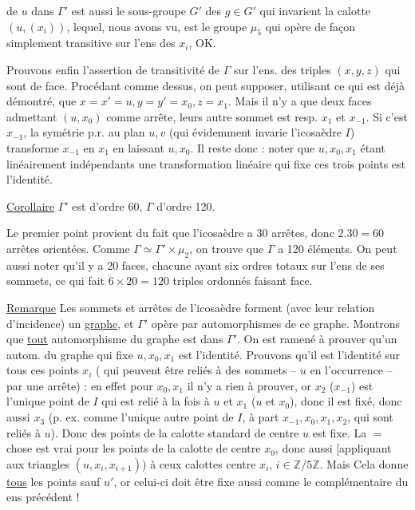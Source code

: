 de $u$ dans  $\Gamma'$ est aussi le sous-groupe  $G'$  des $g\in G'$ qui invarient la calotte $(u,(x_i))$, lequel, nous avons vu, est le groupe $\mu_5$ qui opère de façon simplement transitive sur l'ens des $x_i$, OK.

Prouvons enfin l'assertion de  transitivité de $\Gamma$ sur l'ens. des  triples $(x,y,z)$ qui sont de face. Procédant comme dessus, on peut supposer, utilisant ce qui est déjà démontré, que $x=x'=u,y=y'=x_0,z=x_1$. Mais il n'y a que deux  faces  admettant $(u,x_0)$ comme arrête, leurs autre sommet est resp. $x_1$ et $x_{-1}$. Si c'est $x_{-1}$, la symétrie p.r. au plan $u,v$ (qui évidemment invarie l'icosaèdre $I$) transforme $x_{-1}$ en $x_1$ en laissant $u,x_0$. Il reste donc :  noter que $u,x_0,x_1$  étant linéairement indépendants une transformation linéaire qui fixe ces trois points est l'identité.

\uline{Corollaire} $\Gamma'$ est d'ordre 60, $\Gamma$ d'ordre 120.

Le premier point provient du fait que l'icosaèdre a 30 arrêtes, donc $2.30=60$ arrêtes orientées. Comme $\Gamma\simeq\Gamma'\times\mu_2$, on trouve que $\Gamma$ a 120 éléments. On peut aussi noter qu'il y a 20 faces, chacune ayant  six ordres totaux sur l'ens de ses sommets, ce qui fait $6\times20=120$ triples ordonnés faisant face.

\uline{Remarque} Les sommets et arrêtes de l'icosaèdre forment (avec leur relation d'incidence) un \uline{graphe}, et $\Gamma'$ opère par automorphismes de ce graphe. Montrons que \uline{tout} automorphisme  du graphe est dans $\Gamma'$. On est ramené à  prouver  qu'un autom. du graphe qui fixe $u,x_0,x_1$  est l'identité. Prouvons qu'il est l'identité sur tous ces points $x_i$ ( qui peuvent être reliés à  des sommets -- $u$ en l'occurrence -- par une arrête) : en effet  pour $x_0,x_1$ il n'y a rien à prouver, or $x_2$ ($x_{-1}$) est l'unique point de $I$  qui est relié  à la fois à $u$ et $x_1$ ($u$ et $x_0$), donc il est fixé, donc aussi $x_3$ (p. ex. comme
l'unique autre point de $I$, à part $x_{-1},x_0,x_1,x_2$, qui sont reliés à $u$). Donc   des points  de la calotte standard  de centre $u$ est fixe. La $=$ chose est vrai pour les points de la calotte de centre $x_0$, donc aussi [appliquant  aux triangles $(u,x_i,x_{i+1})$) à ceux  calottes  centre $x_i$, $i\in\mathbb Z/5\mathbb Z$. Mais Cela donne \uline{tous} les points  sauf $u'$, or celui-ci doit être fixe aussi comme le complémentaire du  ens précédent !

